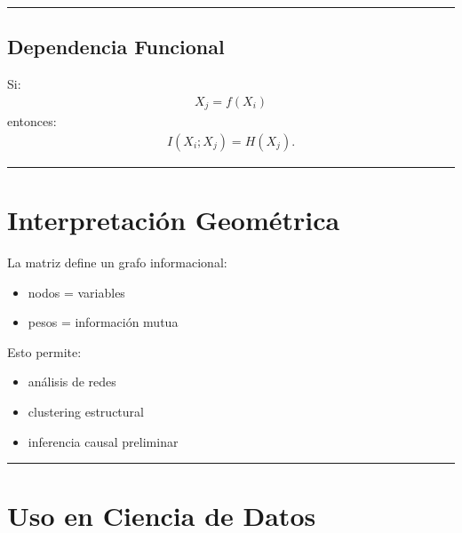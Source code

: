 \documentclass[letterpaper,10pt,english]{jupyterBook}
\begin{document}
\bigskip\hrule\bigskip



\subsection{Dependencia Funcional}
\label{\detokenize{03_multivariate_models/mi_matrix:dependencia-funcional}}
\sphinxAtStartPar
Si:
\begin{equation*}
\begin{split}
X_j=f(X_i)
\end{split}
\end{equation*}
\sphinxAtStartPar
entonces:
\begin{equation*}
\begin{split}
I(X_i;X_j)=H(X_j).
\end{split}
\end{equation*}

\bigskip\hrule\bigskip



\section{Interpretación Geométrica}
\label{\detokenize{03_multivariate_models/mi_matrix:interpretacion-geometrica}}
\sphinxAtStartPar
La matriz define un grafo informacional:
\begin{itemize}
\item {} 
\sphinxAtStartPar
nodos = variables

\item {} 
\sphinxAtStartPar
pesos = información mutua

\end{itemize}

\sphinxAtStartPar
Esto permite:
\begin{itemize}
\item {} 
\sphinxAtStartPar
análisis de redes

\item {} 
\sphinxAtStartPar
clustering estructural

\item {} 
\sphinxAtStartPar
inferencia causal preliminar

\end{itemize}


\bigskip\hrule\bigskip



\section{Uso en Ciencia de Datos}
\label{\detokenize{03_multivariate_models/mi_matrix:uso-en-ciencia-de-datos}}
\end{document}
